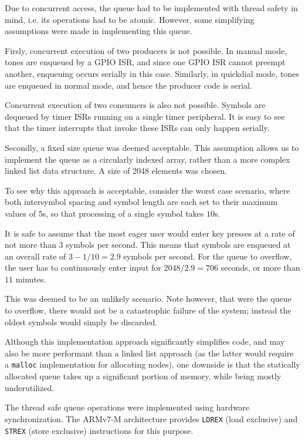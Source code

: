 \documentclass[11pt,a4paper,twocolumn]{scrartcl}
\begin{document}
Due to concurrent access, the queue had to be implemented with thread safety in mind, i.e. its operations had to be atomic. However, some simplifying assumptions were made in implementing this queue.

Firsly, concurrent execution of two producers is not possible. In manual mode, tones are enqueued by a GPIO ISR, and since one GPIO ISR cannot preempt another, enqueuing occurs serially in this case. Similarly, in quickdial mode, tones are enqueued in normal mode, and hence the producer code is serial.

Concurrent execution of two consumers is also not possible. Symbols are dequeued by timer ISRs running on a single timer peripheral. It is easy to see that the timer interrupts that invoke these ISRs can only happen serially.

Secondly, a fixed size queue was deemed acceptable. This assumption allows us to implement the queue as a circularly indexed array, rather than a more complex linked list data structure. A size of 2048 elements was chosen.

To see why this approach is acceptable, consider the worst case scenario, where both intersymbol spacing and symbol length are each set to their maximum values of $5$s, so that processing of a single symbol takes $10$s. 

It is safe to assume that the most eager user would enter key presses at a rate of not more than $3$ symbols per second. This means that symbols are enqueued at an overall rate of $3 - 1/10 = 2.9$ symbols per second. For the queue to overflow, the user has to continuously enter input for $2048/2.9 = 706$ seconds, or more than $11$ minutes.

This was deemed to be an unlikely scenario. Note however, that were the queue to overflow, there would not be a catastrophic failure of the system; instead the oldest symbols would simply be discarded.

Although this implementation approach significantly simplifies code, and may also be more performant than a linked list approach (as the latter would require a \verb!malloc! implementation for allocating nodes), one downside is that the statically allocated queue takes up a significant portion of memory, while being mostly underutilized.

The thread safe queue operations were implemented using hardware synchronization. The ARMv7-M architecture provides \verb!LDREX! (load exclusive) and \verb!STREX! (store exclusive) instructions for this purpose\cite{armv7_m_architecture_manual}.
\end{document}
